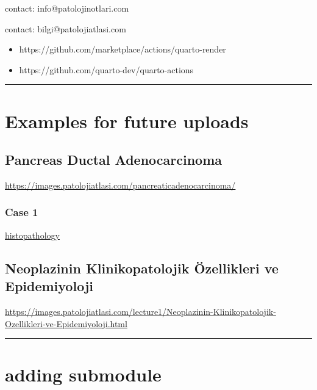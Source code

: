 \documentclass[
  letterpaper,
  DIV=11,
  numbers=noendperiod]{scrreprt}
\begin{document}
contact: info@patolojinotlari.com

contact: bilgi@patolojiatlasi.com

\begin{itemize}
\item
  https://github.com/marketplace/actions/quarto-render
\item
  https://github.com/quarto-dev/quarto-actions
\end{itemize}

\begin{center}\rule{0.5\linewidth}{0.5pt}\end{center}

\hypertarget{examples-for-future-uploads}{%
\chapter{Examples for future
uploads}\label{examples-for-future-uploads}}

\hypertarget{pancreas-ductal-adenocarcinoma}{%
\section{Pancreas Ductal
Adenocarcinoma}\label{pancreas-ductal-adenocarcinoma}}

\url{https://images.patolojiatlasi.com/pancreaticadenocarcinoma/}

\hypertarget{case-1}{%
\subsection{Case 1}\label{case-1}}

\href{https://images.patolojiatlasi.com/pancreaticadenocarcinoma/case1-histopathology/viewer_z0.html}{histopathology}

\hypertarget{neoplazinin-klinikopatolojik-uxf6zellikleri-ve-epidemiyoloji}{%
\section{Neoplazinin Klinikopatolojik Özellikleri ve
Epidemiyoloji}\label{neoplazinin-klinikopatolojik-uxf6zellikleri-ve-epidemiyoloji}}

\url{https://images.patolojiatlasi.com/lecture1/Neoplazinin-Klinikopatolojik-Ozellikleri-ve-Epidemiyoloji.html}

\begin{center}\rule{0.5\linewidth}{0.5pt}\end{center}

\hypertarget{adding-submodule}{%
\chapter{adding submodule}\label{adding-submodule}}
\end{document}
